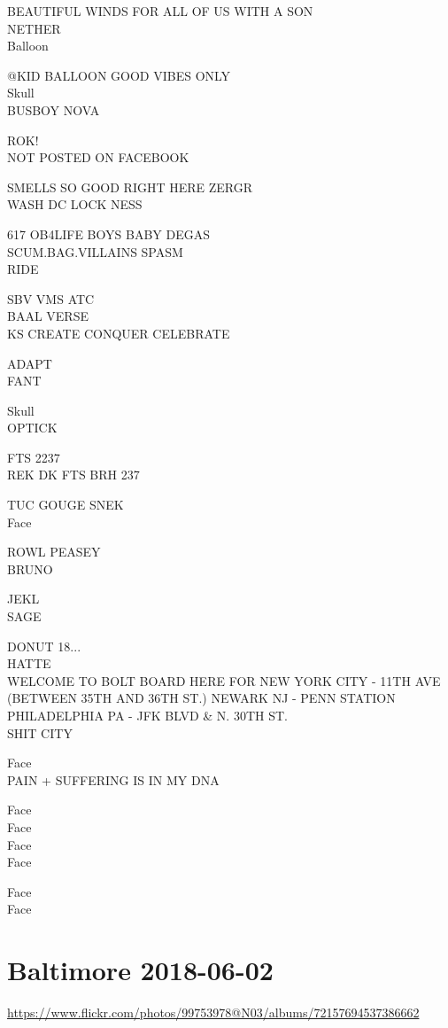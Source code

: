 \documentclass[10pt,letterpaper]{article}
\begin{document}
BEAUTIFUL WINDS FOR ALL OF US WITH A SON\\
NETHER\\
Balloon

@KID BALLOON GOOD VIBES ONLY\\
Skull\\
BUSBOY NOVA

ROK!\\
NOT POSTED ON FACEBOOK

SMELLS SO GOOD RIGHT HERE ZERGR\\
WASH DC LOCK NESS

617 OB4LIFE BOYS BABY DEGAS\\
SCUM.BAG.VILLAINS SPASM\\
RIDE

SBV VMS ATC\\
BAAL VERSE\\
KS CREATE CONQUER CELEBRATE

ADAPT\\
FANT

Skull\\
OPTICK

FTS 2237\\
REK DK FTS BRH 237

TUC GOUGE SNEK\\
Face

ROWL PEASEY\\
BRUNO

JEKL\\
SAGE

DONUT 18...\\
HATTE\\
WELCOME TO BOLT BOARD HERE FOR NEW YORK CITY {-} 11TH AVE (BETWEEN 35TH AND 36TH ST.) NEWARK NJ {-} PENN STATION PHILADELPHIA PA {-} JFK BLVD \& N. 30TH ST.\\
SHIT CITY

Face\\
PAIN + SUFFERING IS IN MY DNA

Face\\
Face\\
Face\\
Face

Face\\
Face


\section*{Baltimore 2018-06-02}

\url{https://www.flickr.com/photos/99753978@N03/albums/72157694537386662}
\end{document}
